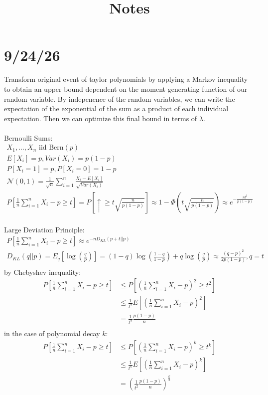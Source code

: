 \documentclass[11pt,a4paper,margin=1in]{article}
\title{Notes}
\author{}
\date{}
\begin{document}
\maketitle

\section*{9/24/26}
Transform original event of taylor polynomials by applying a Markov inequality to
obtain an upper bound dependent on the moment generating function of our random variable.
By indepenence of the random variables, we can write the expectation of the exponential
of the sum as a product of each individual expectation. Then we can optimize this
final bound in terms of $\lambda$.
\\
\\
Bernoulli Sums:
\begin{gather*}
    X_1, \dots, X_n \text{ iid Bern}(p) \\
    E[X_i] = p, Var(X_i) = p(1 - p) \\
    P[X_i = 1] = p, P[X_i = 0] = 1 - p \\ 
    \mathcal{N}(0, 1) = \frac{1}{\sqrt{n}}\sum_{i = 1}^{n}\frac{X_i - E[X_i]}{\sqrt{Var(X_i)}} \\
    P[\frac{1}{n}\sum_{i=1}^{n}X_i - p \geq t] = P[\uparrow \geq t\sqrt{\frac{n}{p(1 - p)}}] \approx 1 - \Phi(t\sqrt{\frac{n}{p(1 - p)}}) \approx e^{-\frac{nt^2}{p(1 - p)}} \\
\end{gather*}

\noindent Large Deviation Principle:
\begin{gather*}
    P[\frac{1}{n}\sum_{i=1}^{n}X_i - p \geq t] \approx e^{-nD_{KL}(p + t || p)} \\
    D_{KL}(q || p) = E_q[\log(\frac{q}{p})] = (1 - q)\log(\frac{1 - q}{1 - p}) + q\log(\frac{q}{p}) \approx \frac{(q - p)^2}{2p(1 - p)}, q = t \\
\end{gather*}
by Chebyshev inequality:
\begin{align*}
    P[\frac{1}{n}\sum_{i=1}^{n}X_i - p \geq t] &\leq P[(\frac{1}{n}\sum_{i=1}^{n}X_i - p)^2 \geq t^2] \\
    &\leq \frac{1}{t^2}E[(\frac{1}{n}\sum_{i=1}^{n}X_i - p)^2] \\ 
    &= \frac{1}{t^2}\frac{p(1 - p)}{n} \\
\end{align*}
in the case of polynomial decay $k$:
\begin{align*}
    P[\frac{1}{n}\sum_{i=1}^{n}X_i - p \geq t] &\leq P[(\frac{1}{n}\sum_{i=1}^{n}X_i - p)^k \geq t^k] \\
    &\leq \frac{1}{t^k}E[(\frac{1}{n}\sum_{i=1}^{n}X_i - p)^k] \\ 
    &= \left(\frac{1}{t^2}\frac{p(1 - p)}{n}\right)^{\frac{k}{2}} \\
\end{align*}
\end{document}
